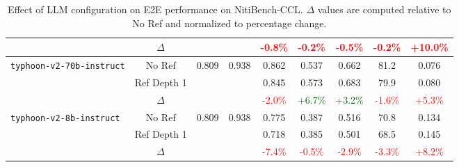 \begin{table}[!ht]
{\begin{tabular}{@{}lcccccccc@{}}
& $\Delta$    &                      &                     & \textcolor{red}{-0.8\%} & \textcolor{red}{-0.2\%} & \textcolor{red}{-0.5\%}  & \textcolor{red}{-0.2\%}  & \textcolor{red}{+10.0\%}  \\ \midrule
\multirow{3}{*}{\texttt{typhoon-v2-70b-instruct}} 
& No Ref      & \multirow{3}{*}{0.809} & \multirow{3}{*}{0.938} & 0.862  & 0.537  & 0.662  & 81.2  & 0.076  \\
& \cellcolor{lightgray}Ref Depth 1 &                      &                     & \cellcolor{lightgray}0.845  & \cellcolor{lightgray}0.573  & \cellcolor{lightgray}0.683  & \cellcolor{lightgray}79.9  & \cellcolor{lightgray}0.080  \\
& $\Delta$    &                      &                     & \textcolor{red}{-2.0\%} & \textcolor{darkgreen}{+6.7\%} & \textcolor{darkgreen}{+3.2\%}  & \textcolor{red}{-1.6\%}  & \textcolor{red}{+5.3\%}  \\ \midrule
\multirow{3}{*}{\texttt{typhoon-v2-8b-instruct}} 
& No Ref      & \multirow{3}{*}{0.809} & \multirow{3}{*}{0.938} & 0.775  & 0.387  & 0.516  & 70.8  & 0.134  \\
& \cellcolor{lightgray}Ref Depth 1 &                      &                     & \cellcolor{lightgray}0.718  & \cellcolor{lightgray}0.385  & \cellcolor{lightgray}0.501  & \cellcolor{lightgray}68.5  & \cellcolor{lightgray}0.145  \\
& $\Delta$    &                      &                     & \textcolor{red}{-7.4\%} & \textcolor{red}{-0.5\%}  & \textcolor{red}{-2.9\%}  & \textcolor{red}{-3.3\%}  & \textcolor{red}{+8.2\%}  \\ \bottomrule
\end{tabular}
}
\caption{Effect of LLM configuration on E2E performance on NitiBench-CCL. $\Delta$ values are computed relative to No Ref and normalized to percentage change.}
\label{table: llm_e2e_main_wcx}
\end{table}



